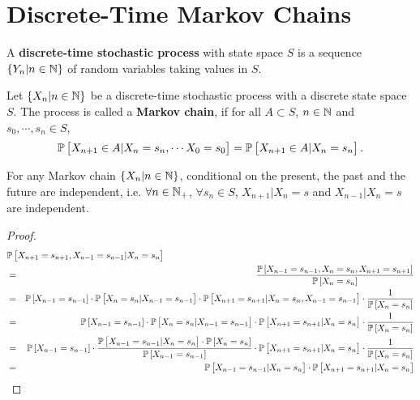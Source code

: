 \section{Discrete-Time Markov Chains}

\begin{definition}
    A \textbf{discrete-time stochastic process} with state space $S$ is a sequence $\{ Y_n | n \in \mathbb{N} \}$ of random variables taking values in $S$.
\end{definition}

\begin{definition}
    Let $\{ X_n | n \in \mathbb{N} \}$ be a discrete-time stochastic process with a discrete state space $S$. The process is called a \textbf{Markov chain}, if for all $A \subset S$, $n \in \mathbb{N}$ and $s_0, \cdots, s_n \in S$, 
    \begin{equation*}
        \mathbb{P} \left[ X_{n+1} \in A | X_n = s_n , \cdots X_0 = s_0 \right] = \mathbb{P} \left[ X_{n+1} \in A | X_n = s_n \right]. 
    \end{equation*}
\end{definition}

\begin{proposition}
    For any Markov chain $\{ X_n | n \in \mathbb{N} \}$, conditional on the present, the past and the future are independent, i.e. $\forall n \in \mathbb{N}_+$, $\forall s_n \in S$, $X_{n+1} | X_n = s$ and $X_{n-1} | X_n = s$ are independent. 
\end{proposition}
\begin{proof}
    \begin{eqnarray*}
        \lefteqn{\prob \left[ X_{n+1} = s_{n+1}, X_{n-1} = s_{n-1} | X_n = s_n \right]}\\ 
        & = & \frac{\prob \left[ X_{n-1} = s_{n-1}, X_n = s_n, X_{n+1} = s_{n+1} \right] }{\prob \left[ X_n = s_n \right]} \\ 
        & = & \prob \left[ X_{n-1} = s_{n-1} \right] \cdot \prob \left[ X_n = s_n | X_{n-1} = s_{n-1} \right] \cdot \prob \left[ X_{n+1} = s_{n+1} | X_n = s_n, X_{n-1} = s_{n-1} \right] \cdot \frac{1}{\prob \left[ X_n = s_n \right] } \\ 
        & = & \prob \left[ X_{n-1} = s_{n-1} \right] \cdot \prob \left[ X_n = s_n | X_{n-1} = s_{n-1} \right] \cdot \prob \left[ X_{n+1} = s_{n+1} | X_n = s_n \right] \cdot \frac{1}{\prob \left[ X_n = s_n \right] } \\ 
        & = & \prob \left[ X_{n-1} = s_{n-1} \right] \cdot \frac{\prob \left[ X_{n-1} = s_{n-1} | X_{n} = s_n \right] \cdot \prob \left[ X_n = s_n \right]}{\prob \left[ X_{n-1} = s_{n-1} \right]} \cdot \prob \left[ X_{n+1} = s_{n+1} | X_n = s_n \right] \cdot \frac{1}{\prob \left[ X_n = s_n \right] } \\ 
        & = & \prob \left[ X_{n-1} = s_{n-1} | X_n = s_n \right] \cdot \prob \left[ X_{n+1} = s_{n+1} | X_n = s_n \right]
    \end{eqnarray*}
\end{proof}

